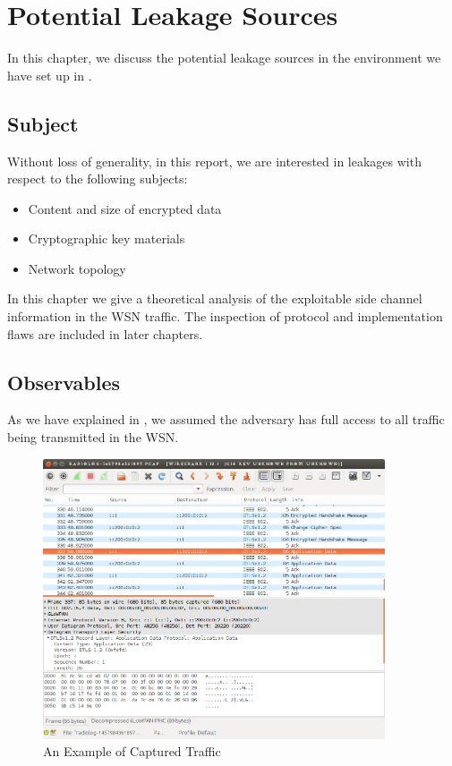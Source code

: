 \chapter{Potential Leakage Sources}

In this chapter, we discuss the potential leakage sources in the environment we have set up in . 

\section{Subject} \label{Sec: Subjects}

Without loss of generality, in this report, we are interested in leakages with respect to the following subjects:

\begin{itemize}
	\item Content and size of encrypted data
	\item Cryptographic key materials
	\item Network topology
\end{itemize}

In this chapter we give a theoretical analysis of the exploitable side channel information in the WSN traffic. The inspection of protocol and implementation flaws are included in later chapters.

\section{Observables} \label{Sec: Observables}

As we have explained in , we assumed the adversary has full access to all traffic being transmitted in the WSN. 

\begin{figure}[th!]
	\center
	\includegraphics[width=0.9\textwidth]{fig/udpexample.png}
	\caption{An Example of Captured Traffic}
	\label{Fig: An Example of Captured Traffic}
\end{figure}

